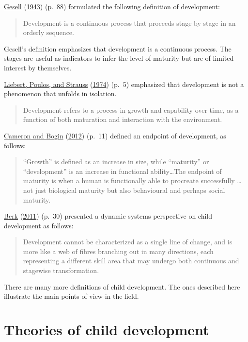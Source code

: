 \documentclass[
]{book}
\begin{document}
\protect\hyperlink{ref-gesell1943}{Gesell} (\protect\hyperlink{ref-gesell1943}{1943}) (p.~88) formulated the following definition of development:

\begin{quote}
Development is a continuous process that proceeds stage by stage in an orderly sequence.
\end{quote}

Gesell's definition emphasizes that development is a continuous process. The stages are useful as indicators to infer the level of maturity but are of limited interest by themselves.

\protect\hyperlink{ref-liebert1974}{Liebert, Poulos, and Strauss} (\protect\hyperlink{ref-liebert1974}{1974}) (p.~5) emphasized that development is not a phenomenon that unfolds in isolation.

\begin{quote}
Development refers to a process in growth and capability over time, as a function of both maturation and interaction with the environment.
\end{quote}

\protect\hyperlink{ref-cameron2012}{Cameron and Bogin} (\protect\hyperlink{ref-cameron2012}{2012}) (p.~11) defined an endpoint of development, as follows:

\begin{quote}
``Growth'' is defined as an increase in size, while ``maturity'' or ``development'' is an increase in functional ability\ldots The endpoint of maturity is when a human is functionally able to procreate successfully \ldots{} not just biological maturity but also behavioural and perhaps social maturity.
\end{quote}

\protect\hyperlink{ref-berk2013}{Berk} (\protect\hyperlink{ref-berk2013}{2011}) (p.~30) presented a dynamic systems perspective on child development as follows:

\begin{quote}
Development cannot be characterized as a single line of change, and is more like a web of fibres branching out in many directions, each representing a different skill area that may undergo both continuous and stagewise transformation.
\end{quote}

There are many more definitions of child development. The ones described here illustrate the main points of view in the field.

\hypertarget{sec:theories}{%
\section{Theories of child development}\label{sec:theories}}
\end{document}
